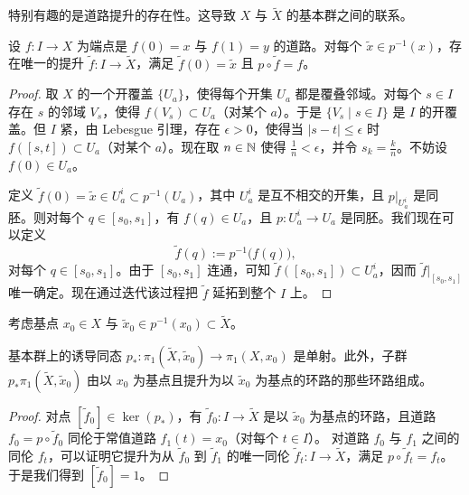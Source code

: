 
特别有趣的是道路提升的存在性。这导致 $X$ 与 $\tilde X$ 的基本群之间的联系。

\begin{proposition}[2.4]
设 $f\colon I\to X$ 为端点是 $f(0)=x$ 与 $f(1)=y$ 的道路。对每个 $\tilde x\in p^{-1}(x)$，存在唯一的提升 $\tilde f\colon I\to\tilde X$，满足 $\tilde f(0)=\tilde x$ 且 $p\circ\tilde f=f$。
\end{proposition}

\begin{proof}
取 $X$ 的一个开覆盖 $\{U_a\}$，使得每个开集 $U_a$ 都是覆叠邻域。对每个 $s\in I$ 存在 $s$ 的邻域 $V_s$，使得 $f(V_s)\subset U_a$（对某个 $a$）。于是 $\{V_s\mid s\in I\}$ 是 $I$ 的开覆盖。但 $I$ 紧，由 Lebesgue 引理，存在 $\epsilon>0$，使得当 $|s-t|\le\epsilon$ 时 $f([s,t])\subset U_a$（对某个 $a$）。现在取 $n\in\mathbb{N}$ 使得 $\tfrac{1}{n}<\epsilon$，并令 $s_k=\tfrac{k}{n}$。不妨设 $f(0)\in U_a$。

定义 $\tilde f(0)=\tilde x\in U_a^i\subset p^{-1}(U_a)$，其中 $U_a^i$ 是互不相交的开集，且 $p|_{U_a^i}$ 是同胚。则对每个 $q\in[s_0,s_1]$，有 $f(q)\in U_a$，且 $p\colon U_a^i\to U_a$ 是同胚。我们现在可以定义
\[
\tilde f(q):=p^{-1}\bigl(f(q)\bigr),
\]
对每个 $q\in[s_0,s_1]$。由于 $[s_0,s_1]$ 连通，可知 $\tilde f([s_0,s_1])\subset U_a^i$，因而 $\tilde f|_{[s_0,s_1]}$ 唯一确定。现在通过迭代该过程把 $\tilde f$ 延拓到整个 $I$ 上。
\end{proof}


考虑基点 $x_0\in X$ 与 $\tilde x_0\in p^{-1}(x_0)\subset\tilde X$。

\begin{proposition}[2.5]
基本群上的诱导同态 $p_*\colon\pi_1(\tilde X,\tilde x_0)\to\pi_1(X,x_0)$ 是单射。此外，子群 $p_*\pi_1(\tilde X,\tilde x_0)$ 由以 $x_0$ 为基点且提升为以 $\tilde x_0$ 为基点的环路的那些环路组成。
\end{proposition}

\begin{proof}
对点 $[\tilde f_0]\in\ker(p_*)$，有 $\tilde f_0\colon I\to\tilde X$ 是以 $\tilde x_0$ 为基点的环路，且道路 $f_0=p\circ\tilde f_0$ 同伦于常值道路 $f_1(t)=x_0$（对每个 $t\in I$）。
对道路 $f_0$ 与 $f_1$ 之间的同伦 $f_t$，可以证明它提升为从 $\tilde f_0$ 到 $\tilde f_1$ 的唯一同伦 $\tilde f_t\colon I\to\tilde X$，满足 $p\circ\tilde f_t=f_t$。于是我们得到 $[\tilde f_0]=1$。
\end{proof}

